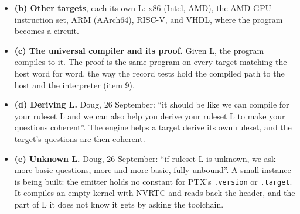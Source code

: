 \begin{enumerate}
\begin{itemize}
\begin{itemize}
\item \textbf{Tessera emitted for the device, a want} (not built). Doug, 26 September: “add emit tessera to the engine wants table, it should run on device as soon as the compiler can it should emit it”. Tessera today is host C (\texttt{tessera\_\allowbreak{}run.\allowbreak{}c} and the daemon's \texttt{tessera\_\allowbreak{}*.\allowbreak{}c} files). Once the emitter can express it, tessera becomes a program the emitter compiles for the device, and its decisions run where the programs run. This ties item 10's stage 4, “Tessera admits with the compiled grant and reads the blocks from host memory”, to the emitter on the device above. The part that can move is the ledger's arithmetic and the decisions over the blocks: each block's command (run, yield, stop) and its grant (registers a thread, threads, device bytes and shared bytes, the registers read from the compile), read and written by a resident program the way item 10's programs talk through their blocks. Three parts stay on the host, a reading. Admission watches operating-system processes, their tree, their signals and their peaks in processors and bytes, and the device sees none of it. A program enters the device through the host's loader (above). One fault ends every program in its CUDA context (item 10, what it must hold), and a scheduler in that context dies with the program it watches. Doug, 27 September: “the tessera was always meant to be part of the compiler itself”. \textbf{Tessera on every target} (not built): the daemon, \texttt{tessera\_\allowbreak{}run} and the seal build with no CUDA toolchain, the Pi first, and runs there become tessera jobs.
\end{itemize}
\item \textbf{(b) Other targets}, each its own L: x86 (Intel, AMD), the AMD GPU instruction set, ARM (AArch64), RISC-V, and VHDL, where the program becomes a circuit.
\item \textbf{(c) The universal compiler and its proof.} Given L, the program compiles to it. The proof is the same program on every target matching the host word for word, the way the record tests hold the compiled path to the host and the interpreter (item 9).
\item \textbf{(d) Deriving L.} Doug, 26 September: “it should be like we can compile for your ruleset L and we can also help you derive your ruleset L to make your questions coherent”. The engine helps a target derive its own ruleset, and the target's questions are then coherent.
\item \textbf{(e) Unknown L.} Doug, 26 September: “if ruleset L is unknown, we ask more basic questions, more and more basic, fully unbound”. A small instance is being built: the emitter holds no constant for PTX's \texttt{.version} or \texttt{.target}. It compiles an empty kernel with NVRTC and reads back the header, and the part of L it does not know it gets by asking the toolchain.


\end{itemize}
\end{enumerate}
